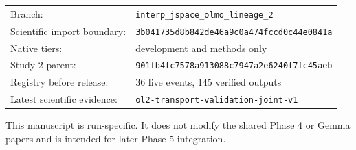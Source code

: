 \documentclass[11pt]{article}
\begin{document}
\begin{titlepage}
\vfill
\begin{tabular}{@{}ll@{}}
Branch: & \nolinkurl{interp_jspace_olmo_lineage_2}\\
Scientific import boundary: & \texttt{3b041735d8b842de46a9c0a474fccd0c44e0841a}\\
Native tiers: & development and methods only\\
Study-2 parent: & \texttt{901fb4fc7578a913088c7947a2e6240f7fc45aeb}\\
Registry before release: & 36 live events, 145 verified outputs\\
Latest scientific evidence: & \nolinkurl{ol2-transport-validation-joint-v1}\\
\end{tabular}

\vspace{0.18in}
{\small\color{slate}This manuscript is run-specific. It does not modify the
shared Phase 4 or Gemma papers and is intended for later Phase 5 integration.}
\end{titlepage}
\end{document}
